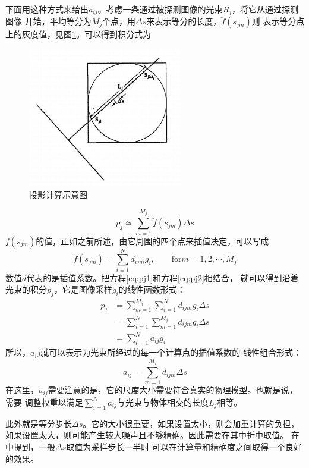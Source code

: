 下面用这种方式来给出$a_{ij}$。考虑一条通过被探测图像的光束$R_j$，将它从通过探测图像
开始，平均等分为$M_j$个点，用$\Delta s$来表示等分的长度，$\breve{f}(s_{jm})$则
表示等分点上的灰度值，见图\ref{fig:sart1}。可以得到积分式为
\begin{figure}[!h]\label{fig:sart1}
\center
\includegraphics[width=0.6\textwidth]{figure/ART/sart1}
\caption{投影计算示意图}
\end{figure}
\begin{equation}\label{eq:pj1}
p_j\simeq\sum^{M_j}_{m=1}\breve{f}(s_{jm})\Delta s
\end{equation}
$\breve{f}(s_{jm})$的值，正如之前所述，由它周围的四个点来插值决定，可以写成
\begin{equation}\label{eq:pj2}
\breve{f}(s_{jm})=\sum^N_{i=1}d_{ijm}g_i,\qquad \text{for}m=1,2,\cdots,M_j
\end{equation}
数值$d$代表的是插值系数。把方程\eqref{eq:pj1}和方程\eqref{eq:pj2}相结合，
就可以得到沿着光束的积分$p_j$，它是图像采样$g_i$的线性函数形式：
\begin{equation}
\begin{split}
p_j&=\sum^{M_j}_{m=1}\sum^N_{i=1}d_{ijm}g_i\Delta s \\
&=\sum^N_{i=1}\sum^{M_j}_{m=1}d_{ijm}g_i\Delta s \\
&=\sum^N_{i=1}a_{ij}g_i
\end{split}
\end{equation}
所以，$a_ij$就可以表示为光束所经过的每一个计算点的插值系数的
线性组合形式：
\begin{equation}
a_{ij}=\sum^{M_j}_{m=1}d_{ijm}\Delta s
\end{equation}
在这里，$a_{ij}$需要注意的是，它的尺度大小需要符合真实的物理模型。也就是说，需要
调整权重以满足$\sum^N_{i=1}a_{ij}$与光束与物体相交的长度$L_j$相等。

此外就是等分步长$\Delta s$。它的大小很重要，如果设置太小，则会加重计算的负担，
如果设置太大，则可能产生较大噪声且不够精确。因此需要在其中折中取值。
在\cite{andersen1984simultaneous}中提到，一般$\Delta s$取值为采样步长一半时
可以在计算量和精确度之间取得一个良好的效果。

